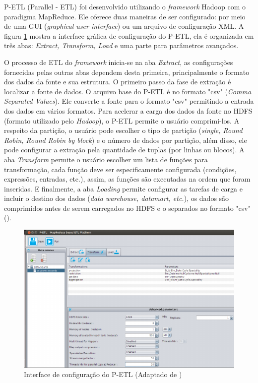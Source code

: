 P-ETL (Parallel - ETL) foi desenvolvido utilizando o \textit{framework} Hadoop com o paradigma MapReduce. Ele oferece duas maneiras de ser configurado: por meio de uma GUI (\textit{graphical user interface}) ou um arquivo de configuração XML. A figura \ref{petl} mostra a interface gráfica de configuração do P-ETL, ela é organizada em três abas: \textit{Extract, Transform, Load} e uma parte para parâmetros avançados. 

O processo de ETL do \textit{framework} inicia-se na aba \textit{Extract}, as configurações fornecidas pelas outras abas dependem desta primeira, principalmente o formato dos dados da fonte e sua estrutura. O primeiro passo da fase de extração é localizar a fonte de dados.  O arquivo base do P-ETL é no formato "csv" (\textit{Comma Separated Values}). Ele converte a fonte para o formato "csv" permitindo a entrada dos dados em vários formatos. Para acelerar a carga dos dados da fonte no HDFS (formato utilizado pelo \textit{Hadoop}), o P-ETL permite o usuário comprimi-los. A respeito da partição, o usuário pode escolher o tipo de partição (\textit{single, Round Robin, Round Robin by block}) e o número de dados por partição, além disso, ele pode configurar a extração pela quantidade de tuplas (por linhas ou blocos). A aba \textit{Transform} permite o usuário escolher um lista de funções para transformação, cada função deve ser especificamente configurada (condições, expressões, entradas, etc.), assim, as funções são executadas na ordem que foram inseridas. E finalmente, a aba \textit{Loading} permite configurar as tarefas de carga e incluir o destino dos dados (\textit{data warehouse, datamart, etc.}), os dados são comprimidos antes de serem carregados no HDFS e o separados no formato "csv" (\cite{bala:2014}).

\begin{figure}[h]
	\centering
	\includegraphics[scale=0.9]{fig/petl.png}
	\caption{Interface de configuração do P-ETL (Adaptado de \cite{bala:2014})}
	\label{petl}
\end{figure}

